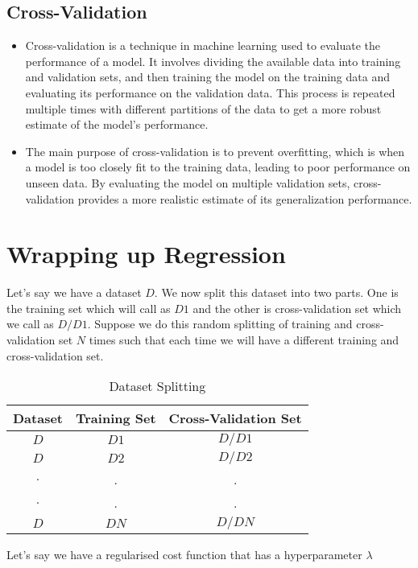 \documentclass[10pt]{article}
\begin{document}
\subsection{Cross-Validation}
\begin{itemize}
    \item Cross-validation is a technique in machine learning used to evaluate the performance of a model. It involves dividing the available data into training and validation sets, and then training the model on the training data and evaluating its performance on the validation data. This process is repeated multiple times with different partitions of the data to get a more robust estimate of the model's performance.

    \item The main purpose of cross-validation is to prevent overfitting, which is when a model is too closely fit to the training data, leading to poor performance on unseen data. By evaluating the model on multiple validation sets, cross-validation provides a more realistic estimate of its generalization performance.
\end{itemize}

\section{Wrapping up Regression}

Let's say we have a dataset $D$. We now split this dataset into two parts. One is the training set which will call as $D1$ and the other is cross-validation set which we call as $D/D1$. Suppose we do this random splitting of training and cross-validation set $N$ times such that each time we will have a different training and cross-validation set.

\begin{table}[ht]
\centering
\begin{tabular}{|c|c|c|}
\hline
\textbf{Dataset} & \textbf{Training Set} & \textbf{Cross-Validation Set} \\ [0.5ex]
\hline
$D$ & $D1$ & $D/D1$\\
\hline
$D$ & $D2$ & $D/D2$\\
\hline
$.$ & . & .\\
$.$ & . & .\\
\hline
$D$ & $DN$ & $D/DN$\\
\hline
\end{tabular}
\caption{Dataset Splitting}
\end{table}

\noindent
Let's say we have a regularised cost function that has a hyperparameter $\lambda$
\end{document}
